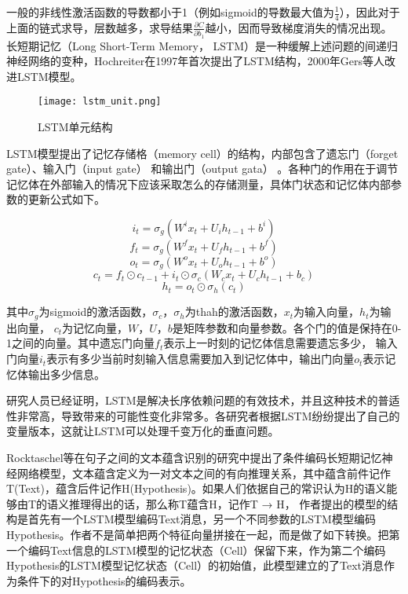 一般的非线性激活函数的导数都小于1（例如sigmoid的导数最大值为$\frac{1}{4}$），因此对于上面的链式求导，层数越多，求导结果$\frac{\partial C}{\partial b_1}$越小，因而导致梯度消失的情况出现。
长短期记忆（Long Short-Term Memory， LSTM）是一种缓解上述问题的间递归神经网络的变种，Hochreiter在1997年首次提出了LSTM结构，2000年Gers等人改进LSTM模型。

\begin{figure}[htbp]
	\centering
	\texttt{[image: lstm\_unit.png]}
	\caption[rnn_vanish]{LSTM单元结构}
\end{figure}

LSTM模型提出了记忆存储格（memory cell）的结构，内部包含了遗忘门（forget gate）、输入门（input gate） 和输出门（output gata） 。各种门的作用在于调节记忆体在外部输入的情况下应该采取怎么的存储测量，具体门状态和记忆体内部参数的更新公式如下。

\begin{equation}\label{lstm_f}i_t=\sigma_g(W^ix_t+U_ih_{t-1}+b^i)\end{equation}
\begin{equation}\label{lstm_f}f_t=\sigma_g(W^fx_t+U_fh_{t-1}+b^f)\end{equation}
\begin{equation}\label{lstm_f}o_t=\sigma_g(W^ox_t+U_oh_{t-1}+b^o)\end{equation}
\begin{equation}\label{lstm_f}c_t=f_t \odot c_{t-1}+i_t\odot \sigma_c(W_cx_t+U_ch_{t-1}+b_c)\end{equation}
\begin{equation}\label{lstm_f}h_t=o_t \odot \sigma_h(c_t)\end{equation}

其中$\sigma_g$为sigmoid的激活函数，$\sigma_c， \sigma_h$为thah的激活函数，$x_t$为输入向量，$h_t$为输出向量， $c_t$为记忆向量，$W，U，b$是矩阵参数和向量参数。各个门的值是保持在0-1之间的向量。其中遗忘门向量$f_t$表示上一时刻的记忆体信息需要遗忘多少， 输入门向量$i_t$表示有多少当前时刻输入信息需要加入到记忆体中，输出门向量$o_t$表示记忆体输出多少信息。

研究人员已经证明，LSTM是解决长序依赖问题的有效技术，并且这种技术的普适性非常高，导致带来的可能性变化非常多。各研究者根据LSTM纷纷提出了自己的变量版本，这就让LSTM可以处理千变万化的垂直问题。

Rocktaschel\cite{rocktaschel2015reasoning}等在句子之间的文本蕴含识别的研究中提出了条件编码长短期记忆神经网络模型，文本蕴含定义为一对文本之间的有向推理关系，其中蕴含前件记作T(Text)，蕴含后件记作H(Hypothesis)。如果人们依据自己的常识认为H的语义能够由T的语义推理得出的话，那么称T蕴含H，记作T → H， 作者提出的模型的结构是首先有一个LSTM模型编码Text消息，另一个不同参数的LSTM模型编码Hypothesis。作者不是简单把两个特征向量拼接在一起，而是做了如下转换。把第一个编码Text信息的LSTM模型的记忆状态（Cell）保留下来，作为第二个编码Hypothesis的LSTM模型记忆状态（Cell）的初始值，此模型建立的了Text消息作为条件下的对Hypothesis的编码表示。

